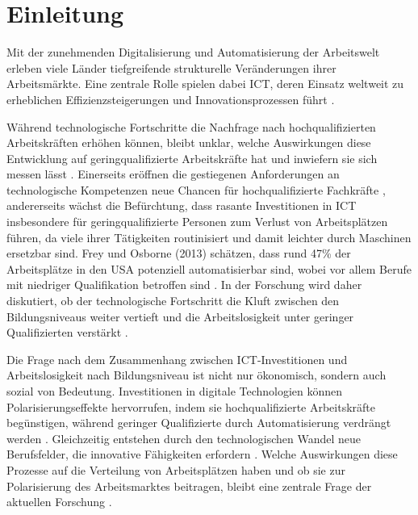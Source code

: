 
\section{Einleitung}

Mit der zunehmenden Digitalisierung und Automatisierung der Arbeitswelt erleben viele 
Länder tiefgreifende strukturelle Veränderungen ihrer Arbeitsmärkte. Eine zentrale Rolle 
spielen dabei \ac{ICT}, deren Einsatz weltweit zu erheblichen Effizienzsteigerungen und 
Innovationsprozessen führt \parencite[vgl.][Kap. 6]{brynjolfsson2014thesecond}.

Während technologische Fortschritte die Nachfrage nach hochqualifizierten Arbeitskräften 
erhöhen können, bleibt unklar, welche Auswirkungen diese Entwicklung auf 
geringqualifizierte Arbeitskräfte hat und inwiefern sie sich messen lässt 
\parencite[vgl.][S. 1045]{acemoglu2011skills}. Einerseits eröffnen die gestiegenen 
Anforderungen an technologische Kompetenzen neue Chancen für hochqualifizierte 
Fachkräfte \parencite[vgl.][S. 1070]{acemoglu2011skills}, andererseits wächst die 
Befürchtung, dass rasante Investitionen in \ac{ICT} insbesondere für geringqualifizierte 
Personen zum Verlust von Arbeitsplätzen führen, da viele ihrer Tätigkeiten routinisiert 
und damit leichter durch Maschinen ersetzbar sind. Frey und Osborne (2013) schätzen, 
dass rund 47\% der Arbeitsplätze in den USA potenziell automatisierbar sind, wobei vor 
allem Berufe mit niedriger Qualifikation betroffen sind 
\parencite[vgl.][S. 14–15]{frey2013thefuture}. In der Forschung wird daher diskutiert, 
ob der technologische Fortschritt die Kluft zwischen den Bildungsniveaus weiter vertieft 
und die Arbeitslosigkeit unter geringer Qualifizierten verstärkt 
\parencite[vgl.][S. 2–4]{balsmeier2019isthis}.

Die Frage nach dem Zusammenhang zwischen \ac{ICT}-Investitionen und Arbeitslosigkeit 
nach Bildungsniveau ist nicht nur ökonomisch, sondern auch sozial von Bedeutung. 
Investitionen in digitale Technologien können Polarisierungseffekte hervorrufen, 
indem sie hochqualifizierte Arbeitskräfte begünstigen, während geringer Qualifizierte 
durch Automatisierung verdrängt werden \parencite[vgl.][S. 14–15]{frey2013thefuture}. 
Gleichzeitig entstehen durch den technologischen Wandel neue Berufsfelder, die 
innovative Fähigkeiten erfordern \parencite[vgl.][Kap. 12]{brynjolfsson2014thesecond}. 
Welche Auswirkungen diese Prozesse auf die Verteilung von Arbeitsplätzen haben und 
ob sie zur Polarisierung des Arbeitsmarktes beitragen, bleibt eine zentrale Frage der 
aktuellen Forschung \parencite[vgl.][S. 2–4]{balsmeier2019isthis}.

